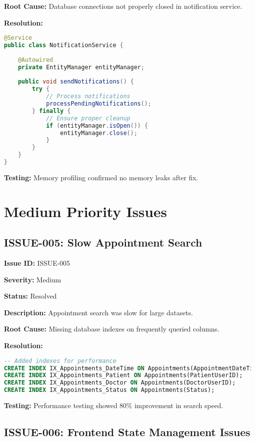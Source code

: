 \documentclass[12pt,a4paper]{article}
\begin{document}
\textbf{Root Cause:} Database connections not properly closed in notification service.

\textbf{Resolution:}
\begin{lstlisting}[language=Java, caption=Memory Leak Fix]
@Service
public class NotificationService {
    
    @Autowired
    private EntityManager entityManager;
    
    public void sendNotifications() {
        try {
            // Process notifications
            processPendingNotifications();
        } finally {
            // Ensure proper cleanup
            if (entityManager.isOpen()) {
                entityManager.close();
            }
        }
    }
}
\end{lstlisting}

\textbf{Testing:} Memory profiling confirmed no memory leaks after fix.

\section{Medium Priority Issues}

\subsection{ISSUE-005: Slow Appointment Search}

\textbf{Issue ID:} ISSUE-005

\textbf{Severity:} Medium

\textbf{Status:} Resolved

\textbf{Description:} Appointment search was slow for large datasets.

\textbf{Root Cause:} Missing database indexes on frequently queried columns.

\textbf{Resolution:}
\begin{lstlisting}[language=SQL, caption=Database Indexes]
-- Added indexes for performance
CREATE INDEX IX_Appointments_DateTime ON Appointments(AppointmentDateTime);
CREATE INDEX IX_Appointments_Patient ON Appointments(PatientUserID);
CREATE INDEX IX_Appointments_Doctor ON Appointments(DoctorUserID);
CREATE INDEX IX_Appointments_Status ON Appointments(Status);
\end{lstlisting}

\textbf{Testing:} Performance testing showed 80\% improvement in search speed.

\subsection{ISSUE-006: Frontend State Management Issues}
\end{document}
